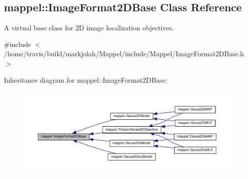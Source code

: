 \hypertarget{classmappel_1_1ImageFormat2DBase}{}\subsection{mappel\+:\+:Image\+Format2\+D\+Base Class Reference}
\label{classmappel_1_1ImageFormat2DBase}


A virtual base class for 2D image localization objectives.  




{\ttfamily \#include $<$/home/travis/build/markjolah/\+Mappel/include/\+Mappel/\+Image\+Format2\+D\+Base.\+h$>$}



Inheritance diagram for mappel\+:\+:Image\+Format2\+D\+Base\+:\nopagebreak
\begin{figure}[H]
\begin{center}
\leavevmode
\includegraphics[width=350pt]{classmappel_1_1ImageFormat2DBase__inherit__graph}
\end{center}
\end{figure}
